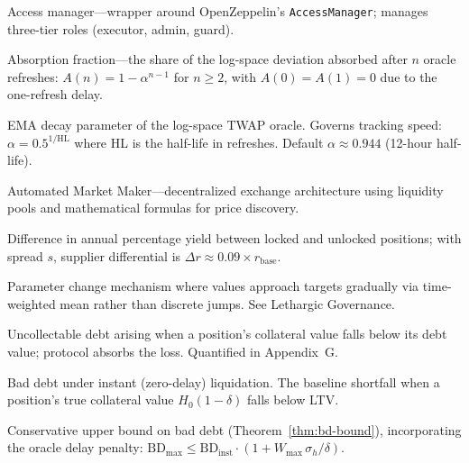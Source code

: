 \documentclass[10pt,a4paper,twocolumn]{article}
\theoremstyle{definition}
\theoremstyle{plain}
\theoremstyle{remark}
\begin{document}
\begin{description}[style=nextline, leftmargin=2.5em, labelindent=0em, font=\normalfont\bfseries]


\item[Acma] Access manager---wrapper around OpenZeppelin's \texttt{AccessManager}; manages three-tier roles (executor, admin, guard).

\item[$A(n)$\,$\dagger$] Absorption fraction---the share of the log-space deviation absorbed after $n$ oracle refreshes: $A(n) = 1 - \alpha^{n-1}$ for $n \geq 2$, with $A(0) = A(1) = 0$ due to the one-refresh delay.

\item[$\alpha$\,$\dagger$] EMA decay parameter of the log-space TWAP oracle. Governs tracking speed: $\alpha = 0.5^{1/\text{HL}}$ where HL is the half-life in refreshes. Default $\alpha \approx 0.944$ (12-hour half-life).

\item[AMM] Automated Market Maker---decentralized exchange architecture using liquidity pools and mathematical formulas for price discovery.

\item[APY Differential] Difference in annual percentage yield between locked and unlocked positions; with spread $s$, supplier differential is $\Delta r \approx 0.09 \times r_{\text{base}}$.

\item[Asymptotic Transition] Parameter change mechanism where values approach targets gradually via time-weighted mean rather than discrete jumps. See Lethargic Governance.


\item[Bad Debt] Uncollectable debt arising when a position's collateral value falls below its debt value; protocol absorbs the loss. Quantified in Appendix~G.

\item[$\text{BD}_{\text{inst}}$\,$\dagger$] Bad debt under instant (zero-delay) liquidation. The baseline shortfall when a position's true collateral value $H_0(1{-}\delta)$ falls below LTV.

\item[$\text{BD}_{\max}$\,$\dagger$] Conservative upper bound on bad debt (Theorem~\ref{thm:bd-bound}), incorporating the oracle delay penalty: $\text{BD}_{\max} \leq \text{BD}_{\text{inst}} \cdot (1 + W_{\max}\,\sigma_h / \delta)$.


\end{description}
\end{document}
